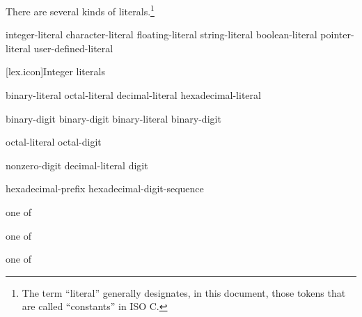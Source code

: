 \pnum
{}%
%
There are several kinds of literals.\footnote{The term ``literal'' generally designates, in this
document, those tokens that are called ``constants'' in
ISO C. }

\begin{bnf}
\br
    integer-literal\br
    character-literal\br
    floating-literal\br
    string-literal\br
    boolean-literal\br
    pointer-literal\br
    user-defined-literal
\end{bnf}

[lex.icon]{Integer literals}

%
\begin{bnf}
\br
    binary-literal \br
    octal-literal \br
    decimal-literal \br
    hexadecimal-literal 
\end{bnf}

\begin{bnf}
\br
     binary-digit\br
     binary-digit\br
    binary-literal  binary-digit
\end{bnf}

\begin{bnf}
\br
    \br
    octal-literal  octal-digit
\end{bnf}

\begin{bnf}
\br
    nonzero-digit\br
    decimal-literal  digit
\end{bnf}

\begin{bnf}
\br
    hexadecimal-prefix hexadecimal-digit-sequence
\end{bnf}

\begin{bnf}
 \textnormal{one of}\br
\end{bnf}

\begin{bnf}
 \textnormal{one of}\br
\end{bnf}

\begin{bnf}
 \textnormal{one of}\br
\end{bnf}

